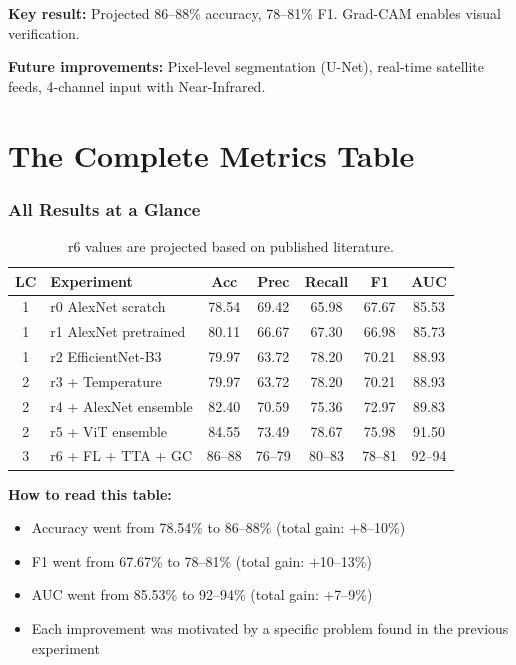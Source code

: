 \documentclass[11pt]{article}
\begin{document}
\textbf{Key result:} Projected 86--88\% accuracy, 78--81\% F1. Grad-CAM enables visual verification.

\textbf{Future improvements:} Pixel-level segmentation (U-Net), real-time satellite feeds, 4-channel input with Near-Infrared.

\part{The Complete Metrics Table}

\section{All Results at a Glance}

\begin{table}[H]
    \centering
    \renewcommand{\arraystretch}{1.3}
    \begin{tabular}{clccccc}
        \toprule
        \textbf{LC} & \textbf{Experiment} & \textbf{Acc} & \textbf{Prec} & \textbf{Recall} & \textbf{F1} & \textbf{AUC} \\
        \midrule
        1 & r0 AlexNet scratch & 78.54 & 69.42 & 65.98 & 67.67 & 85.53 \\
        1 & r1 AlexNet pretrained & 80.11 & 66.67 & 67.30 & 66.98 & 85.73 \\
        1 & r2 EfficientNet-B3 & 79.97 & 63.72 & 78.20 & 70.21 & 88.93 \\
        \midrule
        2 & r3 + Temperature & 79.97 & 63.72 & 78.20 & 70.21 & 88.93 \\
        2 & r4 + AlexNet ensemble & 82.40 & 70.59 & 75.36 & 72.97 & 89.83 \\
        2 & r5 + ViT ensemble & 84.55 & 73.49 & 78.67 & 75.98 & 91.50 \\
        \midrule
        3 & r6 + FL + TTA + GC & 86--88 & 76--79 & 80--83 & 78--81 & 92--94 \\
        \bottomrule
    \end{tabular}
    \caption{r6 values are projected based on published literature.}
\end{table}

\textbf{How to read this table:}
\begin{itemize}[noitemsep]
    \item Accuracy went from 78.54\% to 86--88\% (total gain: +8--10\%)
    \item F1 went from 67.67\% to 78--81\% (total gain: +10--13\%)
    \item AUC went from 85.53\% to 92--94\% (total gain: +7--9\%)
    \item Each improvement was motivated by a specific problem found in the previous experiment
\end{itemize}
\end{document}
